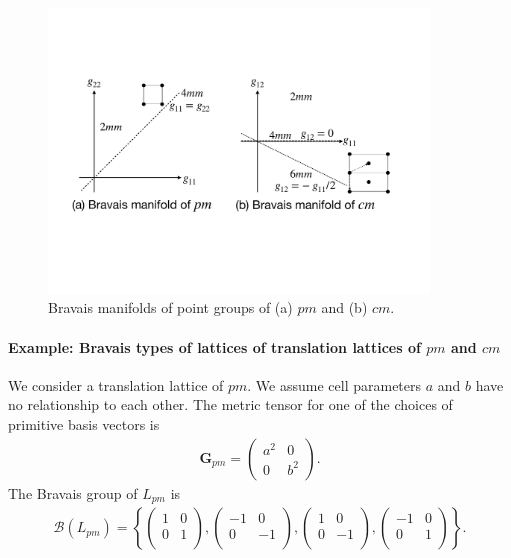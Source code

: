 \begin{figure}[tb]
  \centering
  \includegraphics[width=0.9\textwidth]{figure/fig_Bravais_manifold.pdf}
  \caption{Bravais manifolds of point groups of (a) $pm$ and (b) $cm$.}
  \label{fig:bravais_manifold}
\end{figure}

\paragraph{Example: Bravais types of lattices of translation lattices of $pm$ and $cm$}

We consider a translation lattice of $pm$.
We assume cell parameters $a$ and $b$ have no relationship to each other.
The metric tensor for one of the choices of primitive basis vectors is
\begin{align*}
  \bm{G}_{pm} = \begin{pmatrix} a^{2} & 0 \\ 0 & b^{2} \end{pmatrix}.
\end{align*}
The Bravais group of $L_{pm}$ is
\begin{align}
  \label{eq:bravais_group_pm_general}
  \mathcal{B}(L_{pm}) = \left\{
    \begin{pmatrix} 1 & 0 \\ 0 & 1 \\ \end{pmatrix},
    \begin{pmatrix} -1 & 0 \\ 0 & -1 \\ \end{pmatrix},
    \begin{pmatrix} 1 & 0 \\ 0 & -1 \\ \end{pmatrix},
    \begin{pmatrix} -1 & 0 \\ 0 & 1 \\ \end{pmatrix}
  \right\}.
\end{align}

